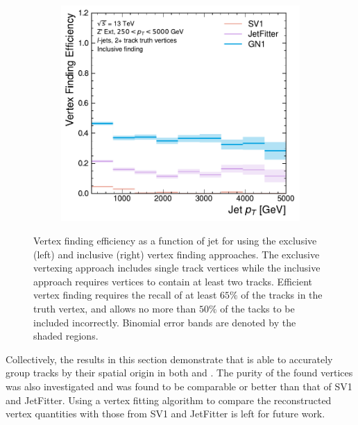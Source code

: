 \begin{figure}[!htbp]
\begin{subfigure}[b]{0.48\textwidth}
        \includegraphics[width=\textwidth]{chapters/gnn_tagger/figs/results/tracks/zprime/zprime_ljet_vert_eff_2+_track_incl.pdf}
    \end{subfigure}
    \caption{
        Vertex finding efficiency as a function of jet \pt for \Zprimeljets using the exclusive (left) and inclusive (right) vertex finding approaches.
        The exclusive vertexing approach includes single track vertices while the inclusive approach requires vertices to contain at least two tracks.
        Efficient vertex finding requires the recall of at least $65\%$ of the tracks in the truth vertex, and allows no more than $50\%$ of the tacks to be included incorrectly.
        Binomial error bands are denoted by the shaded regions.
        }
    \label{fig:zprime_vert_leff}
\end{figure}


Collectively, the results in this section demonstrate that \GNN is able to accurately group tracks by their spatial origin in both \bjets and \ljets.
The purity of the found vertices was also investigated and was found to be comparable or better than that of SV1 and JetFitter.
Using a vertex fitting algorithm to compare the reconstructed vertex quantities with those from SV1 and JetFitter is left for future work.



